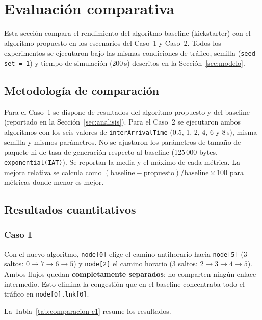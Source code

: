 \documentclass[10pt,letterpaper,twocolumn]{article}
\begin{document}
\section{Evaluación comparativa}
\label{sec:evaluacion}

Esta sección compara el rendimiento del algoritmo baseline (kickstarter) con
el algoritmo propuesto en los escenarios del Caso~1 y Caso~2. Todos los
experimentos se ejecutaron bajo las mismas condiciones de tráfico, semilla
(\texttt{seed-set\,=\,1}) y tiempo de simulación (200\,s) descritos en la
Sección~\ref{sec:modelo}.

\subsection{Metodología de comparación}

Para el Caso~1 se dispone de resultados del algoritmo propuesto y del
baseline (reportado en la Sección~\ref{sec:analisis}). Para el Caso~2 se
ejecutaron ambos algoritmos con los seis valores de \texttt{interArrivalTime}
(0.5, 1, 2, 4, 6 y 8\,s), misma semilla y mismos parámetros. No se
ajustaron los parámetros de tamaño de paquete ni de tasa de generación
respecto al baseline (125\,000 bytes, \texttt{exponential(IAT)}). Se
reportan la media y el máximo de cada métrica. La mejora relativa se calcula
como $(\mathrm{baseline} - \mathrm{propuesto})/\mathrm{baseline}\times100$
para métricas donde menor es mejor.

\subsection{Resultados cuantitativos}

\subsubsection*{Caso 1}

Con el nuevo algoritmo, \texttt{node[0]} elige el camino antihorario hacia
\texttt{node[5]} (3 saltos: $0{\to}7{\to}6{\to}5$) y \texttt{node[2]} el
camino horario (3 saltos: $2{\to}3{\to}4{\to}5$). Ambos flujos quedan
\textbf{completamente separados}: no comparten ningún enlace intermedio.
Esto elimina la congestión que en el baseline concentraba todo el tráfico
en \texttt{node[0].lnk[0]}.

La Tabla~\ref{tab:comparacion-c1} resume los resultados.
\end{document}
